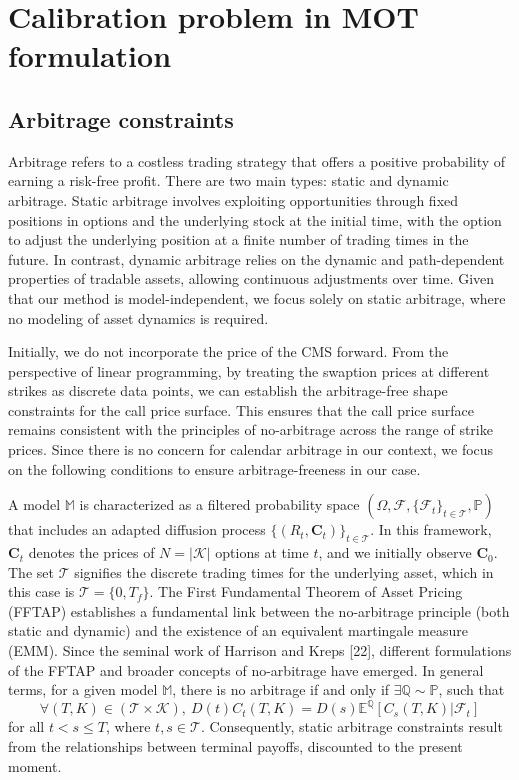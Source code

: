 \chapter{Calibration problem in MOT formulation}
\section{Arbitrage constraints}
Arbitrage refers to a costless trading strategy that offers a positive probability of 
earning a risk-free profit. There are two main types: static and dynamic arbitrage. 
Static arbitrage involves exploiting opportunities through fixed positions in options and the 
underlying stock at the initial time, with the option to adjust the underlying position at a 
finite number of trading times in the future. In contrast, dynamic arbitrage relies on the 
dynamic and path-dependent properties of tradable assets, allowing continuous adjustments over 
time. Given that our method is model-independent, we focus solely on static arbitrage, where no 
modeling of asset dynamics is required.

Initially, we do not incorporate the price of the CMS forward. From the perspective of linear 
programming, by treating the swaption prices at different strikes as discrete data points, 
we can establish the arbitrage-free shape constraints for the call price surface. This ensures 
that the call price surface remains consistent with the principles of no-arbitrage across the 
range of strike prices. Since there is no concern for calendar arbitrage in our context, 
we focus on the following conditions to ensure arbitrage-freeness in our case.

A model \(\mathbb{M}\) is characterized as a filtered probability space 
$(\Omega,\mathcal{F},\{\mathcal{F}_{t}\}_{t\in\mathcal{T}},\mathbb{P})$
that includes an adapted diffusion process \(\{(R_{t},\mathbf{C}_{t})\}_{t\in\mathcal{T}}\). 
In this framework, \(\mathbf{C}_{t}\) denotes the prices of \(N = |\mathcal{K}|\) options at time \(t\), 
and we initially observe \(\mathbf{C}_{0}\). 
The set \(\mathcal{T}\) signifies the discrete trading times for the underlying asset, 
which in this case is \(\mathcal{T} = \{0, T_{f}\}\).
The First Fundamental Theorem of Asset Pricing (FFTAP) establishes a fundamental link between the 
no-arbitrage principle (both static and dynamic) and the existence of an equivalent martingale measure (EMM). 
Since the seminal work of Harrison and Kreps [22], different formulations of the FFTAP and broader concepts 
of no-arbitrage have emerged. In general terms, for a given model \(\mathbb{M}\), there is no arbitrage 
if and only if $\exists \mathbb{Q} \sim \mathbb{P}$, such that
\[
\forall(T,K)\in (\mathcal{T} \times \mathcal{K}),\ D(t)C_{t}(T, K)=D(s)\mathbb{E}^{\mathbb{Q}}[C_{s}(T,K)|\mathcal{F}_{t}]
\]
for all \(t < s \leq T\), where \(t, s \in \mathcal{T}\). 
Consequently, static arbitrage constraints result from the relationships between terminal payoffs, 
discounted to the present moment.

